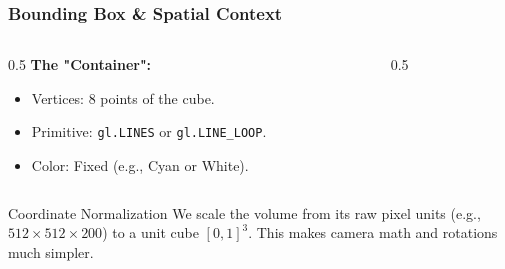 \begin{frame}
\frametitle{Bounding Box \& Spatial Context}
\begin{columns}
\begin{column}{0.5\textwidth}
\textbf{The "Container":}
\begin{itemize}
  \item Vertices: 8 points of the cube.
  \item Primitive: \texttt{gl.LINES} or \texttt{gl.LINE\_LOOP}.
  \item Color: Fixed (e.g., Cyan or White).
\end{itemize}
\end{column}
\begin{column}{0.5\textwidth}
\end{column}
\end{columns}

\begin{exampleblock}{Coordinate Normalization}
We scale the volume from its raw pixel units (e.g., $512 \times 512 \times 200$) to a unit cube $[0, 1]^3$. This makes camera math and rotations much simpler.
\end{exampleblock}
\end{frame}
